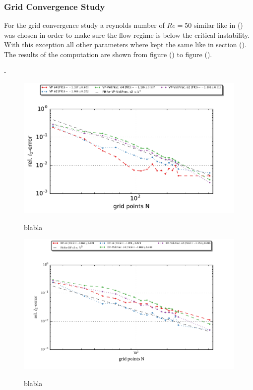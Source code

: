 \subsubsection{Grid Convergence Study}

For the grid convergence study a reynolds number of $Re=50$  similar like in () was chosen in order to make sure the flow regime
is below the critical instability. With this exception all other parameters where kept the same like in section ().
The results of the computation are shown from figure () to figure ().

-


\newpage
\begin{figure}[!pt]
  \centering
  \includegraphics{gfx/immersed_boundary/tcflow/theo/vp.pdf}\label{fig:hpflow_vpgc_theo}
  \caption{blabla}
\end{figure}

\begin{figure}[!pb]
  \centering
  \includegraphics{gfx/immersed_boundary/tcflow/theo/df.pdf}\label{fig:hpflow_dfgc_theo}
  \caption{blabla}
\end{figure}


